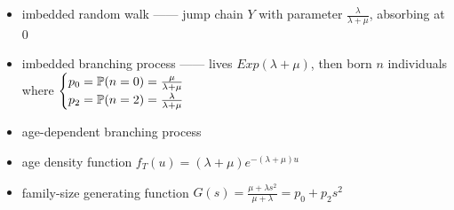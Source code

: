 \begin{itemize}
    \item imbedded random walk ------ jump chain $Y$ with parameter $\frac{\lambda}{\lambda + \mu}$, absorbing at 0
    \item imbedded branching process ------ lives $Exp(\lambda + \mu)$, then born $n$ individuals where $\begin{cases}
                                                                                    p_0 = \mathbb{P}(n = 0) = \frac{\mu}{\lambda + \mu}\\
                                                                                    p_2 = \mathbb{P}(n = 2) =\frac{\lambda}{\lambda + \mu}
    \end{cases}$
    \item age-dependent branching process
    \item age density function $f_T(u) = (\lambda + \mu)e^{-(\lambda + \mu)u}$
    \item family-size generating function $G(s) = \frac{\mu + \lambda s^2}{\mu + \lambda} = p_0 + p_2 s^2$
\end{itemize}